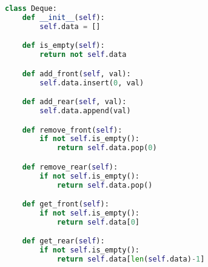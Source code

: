 \begin{lstlisting}[language=Python]
class Deque:
    def __init__(self):
        self.data = []

    def is_empty(self):
        return not self.data

    def add_front(self, val):
        self.data.insert(0, val)

    def add_rear(self, val):
        self.data.append(val)

    def remove_front(self):
        if not self.is_empty():
            return self.data.pop(0)

    def remove_rear(self):
        if not self.is_empty():
            return self.data.pop()

    def get_front(self):
        if not self.is_empty():
            return self.data[0]

    def get_rear(self):
        if not self.is_empty():
            return self.data[len(self.data)-1]
\end{lstlisting}

\newpage